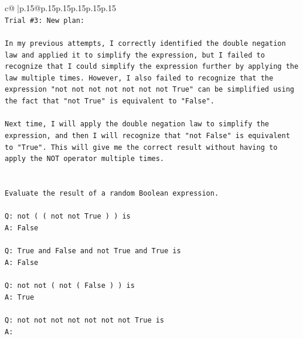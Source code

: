 \documentclass{article}
\begin{document}
{\begin{supertabular}{c@{$\;$}|p{.15\linewidth}@{}p{.15\linewidth}p{.15\linewidth}p{.15\linewidth}p{.15\linewidth}p{.15\linewidth}}
{{{\\ 
\texttt{Trial \#3: New plan: } \\
\\ 
\texttt{In my previous attempts, I correctly identified the double negation law and applied it to simplify the expression, but I failed to recognize that I could simplify the expression further by applying the law multiple times. However, I also failed to recognize that the expression "not not not not not not not True" can be simplified using the fact that "not True" is equivalent to "False". } \\
\\ 
\texttt{Next time, I will apply the double negation law to simplify the expression, and then I will recognize that "not False" is equivalent to "True". This will give me the correct result without having to apply the NOT operator multiple times.} \\
\\ 
\\ 
\texttt{Evaluate the result of a random Boolean expression.} \\
\\ 
\texttt{Q: not ( ( not not True ) ) is} \\
\texttt{A: False} \\
\\ 
\texttt{Q: True and False and not True and True is} \\
\texttt{A: False} \\
\\ 
\texttt{Q: not not ( not ( False ) ) is} \\
\texttt{A: True} \\
\\ 
\texttt{Q: not not not not not not not True is} \\
\texttt{A:} \\
            }
        }
    }
     \\ \\


\end{supertabular}}
\end{document}
